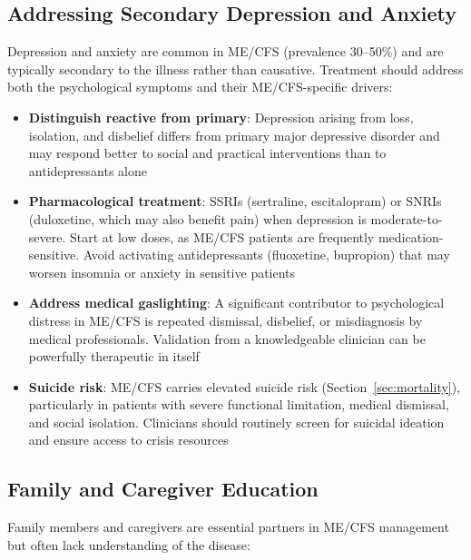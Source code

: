 \subsection{Addressing Secondary Depression and Anxiety}

Depression and anxiety are common in ME/CFS (prevalence 30--50\%) and are typically secondary to the illness rather than causative. Treatment should address both the psychological symptoms and their ME/CFS-specific drivers:

\begin{itemize}
    \item \textbf{Distinguish reactive from primary}: Depression arising from loss, isolation, and disbelief differs from primary major depressive disorder and may respond better to social and practical interventions than to antidepressants alone
    \item \textbf{Pharmacological treatment}: SSRIs (sertraline, escitalopram) or SNRIs (duloxetine, which may also benefit pain) when depression is moderate-to-severe. Start at low doses, as ME/CFS patients are frequently medication-sensitive. Avoid activating antidepressants (fluoxetine, bupropion) that may worsen insomnia or anxiety in sensitive patients
    \item \textbf{Address medical gaslighting}: A significant contributor to psychological distress in ME/CFS is repeated dismissal, disbelief, or misdiagnosis by medical professionals. Validation from a knowledgeable clinician can be powerfully therapeutic in itself
    \item \textbf{Suicide risk}: ME/CFS carries elevated suicide risk (Section~\ref{sec:mortality}), particularly in patients with severe functional limitation, medical dismissal, and social isolation. Clinicians should routinely screen for suicidal ideation and ensure access to crisis resources
\end{itemize}

\subsection{Family and Caregiver Education}

Family members and caregivers are essential partners in ME/CFS management but often lack understanding of the disease:

